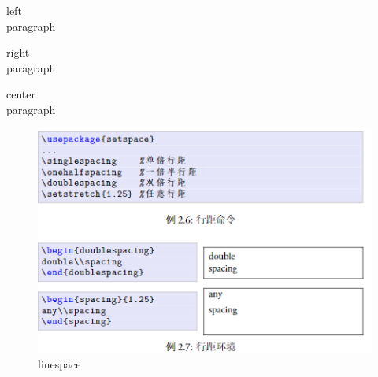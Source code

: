 \documentclass{article}
\begin{document}

\begin{flushleft}left\\paragraph\end{flushleft} %
\begin{flushright}right\\paragraph\end{flushright} %
\begin{center}center\\paragraph\end{center} %



\begin{figure}
	\centering
	\includegraphics[width=1.0\textwidth]{linespace.png} %
	\caption{linespace} %
	\label{img} %
\end{figure}
\end{document}
